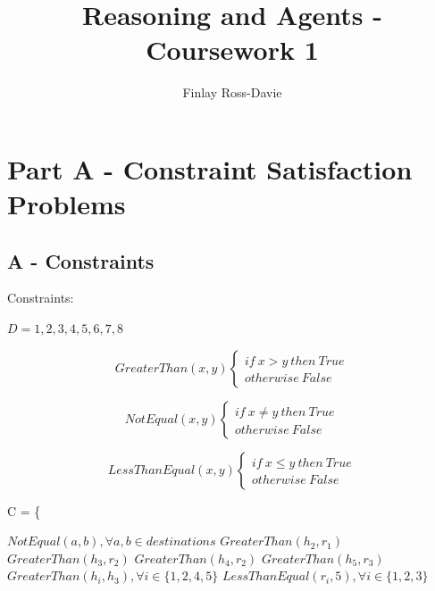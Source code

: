 \documentclass{article}
\title{Reasoning and Agents - Coursework 1}
\author{Finlay Ross-Davie}
\begin{document}
\maketitle

\section{Part A - Constraint Satisfaction Problems}

\subsection{A - Constraints}

Constraints:

$D = {1,2,3,4,5,6,7,8}$

\begin{equation}
GreaterThan(x,y)
    \begin{cases}
        if \: x > y \: then \: True \\
        otherwise \: False
    \end{cases}
\end{equation}

\begin{equation}
NotEqual(x,y)
    \begin{cases}
        if \: x \neq y \: then \: True \\
        otherwise \: False
    \end{cases}
\end{equation}

\begin{equation}
LessThanEqual(x,y)
    \begin{cases}
        if \: x \leq y \: then \: True \\
        otherwise \: False
    \end{cases}
\end{equation}


C = \{\

$NotEqual(a,b), \forall a, b \in destinations$ \newline
$GreaterThan(h_2,r_1)$ \newline
$GreaterThan(h_3, r_2)$ \newline
$GreaterThan(h_4, r_2)$ \newline
$GreaterThan(h_5, r_3)$ \newline
$GreaterThan(h_i,h_3), \forall i \in \{1,2,4,5\}$ \newline
$LessThanEqual(r_i,5), \forall i \in \{1,2,3\}$ \newline 
\end{document}
